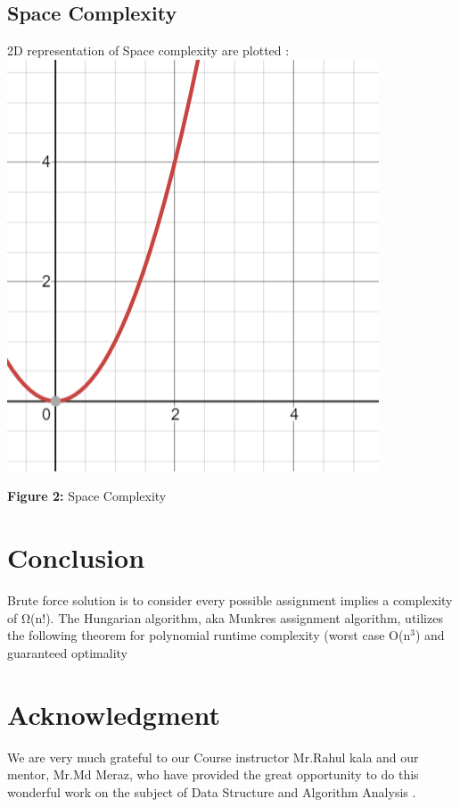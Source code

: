 \documentclass[conference]{IEEEtran}
\begin{document}
\subsection{Space Complexity}
2D representation of Space complexity are plotted :\newline\\
\includegraphics[scale=0.75]{Space_complex.png}
\begin{center}\textbf{Figure 2:} Space Complexity\end{center}

\section{Conclusion}
Brute force solution is to consider every possible assignment implies a complexity of Ω(n!).
The Hungarian algorithm, aka Munkres assignment algorithm, utilizes the following theorem for polynomial runtime complexity (worst case O(n$^{3}$) and guaranteed optimality

\section{Acknowledgment}
We are very much grateful to our Course instructor Mr.Rahul kala and our mentor, Mr.Md Meraz, who have provided the great opportunity to do this wonderful work on the subject of Data Structure and Algorithm Analysis .
\end{document}
